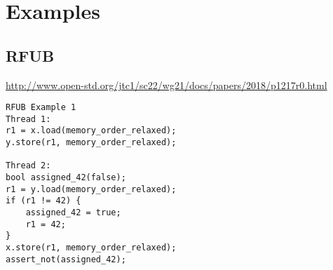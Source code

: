 \section{Examples}
\label{sec:examples}

\subsection{RFUB}\label{rfub}
\url{http://www.open-std.org/jtc1/sc22/wg21/docs/papers/2018/p1217r0.html}
\begin{verbatim}
RFUB Example 1
Thread 1:	                        
r1 = x.load(memory_order_relaxed);
y.store(r1, memory_order_relaxed);	

Thread 2:
bool assigned_42(false);
r1 = y.load(memory_order_relaxed);
if (r1 != 42) {
    assigned_42 = true;
    r1 = 42;
}
x.store(r1, memory_order_relaxed);
assert_not(assigned_42);
\end{verbatim}

